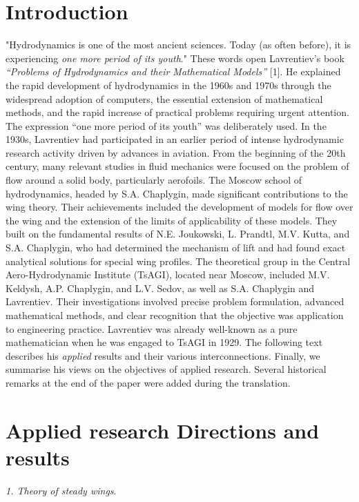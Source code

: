 \documentclass[%
 reprint,
onecolumn,
 amsmath,amssymb, aps,
]{revtex4-2}
\numberwithin{equation}{section}
\begin{document}
\section{Introduction}
"Hydrodynamics is one of the most ancient sciences.  Today (as often before), it is experiencing \textit{one more period of its youth}."
These words open Lavrentiev's book \emph {“Problems of Hydrodynamics and their Mathematical Models”} [1].
He explained the rapid development of hydrodynamics in the 1960s and 1970s through the widespread adoption of computers, the essential extension of mathematical methods, and the rapid increase of practical problems requiring urgent attention.
The expression “one more period of its youth” was deliberately used.
In the 1930s, Lavrentiev had participated in an earlier period of intense hydrodynamic research activity driven by advances in aviation. From the beginning of the 20th century, many relevant studies in fluid mechanics were focused on the problem of flow around a solid body, particularly aerofoils.
The Moscow school of hydrodynamics, headed by S.A. Chaplygin, made significant contributions to the wing theory.
Their achievements included the development of models for flow over the wing and the extension of the limits of applicability of these models.
They built on the fundamental results of N.E. Joukowski, L. Prandtl, M.V. Kutta, and S.A. Chaplygin, who had determined the mechanism of lift and had found exact analytical solutions for special wing profiles.
The theoretical group in the Central Aero-Hydrodynamic Institute (TsAGI), located near Moscow, included M.V. Keldysh, A.P. Chaplygin, and L.V. Sedov, as well as S.A. Chaplygin and Lavrentiev.
Their investigations involved precise problem formulation, advanced mathematical methods, and clear recognition that the objective was application to engineering practice.
Lavrentiev was already well-known as a pure mathematician when he was engaged to TsAGI in 1929.
The following text describes his \emph {applied} results and their various interconnections.
Finally, we summarise his views on the objectives of applied research.
Several historical remarks at the end of the paper were added during the translation.

\section{Applied research Directions and results}

\textit{1. Theory of steady wings}.
\vspace{1mm}
\end{document}
